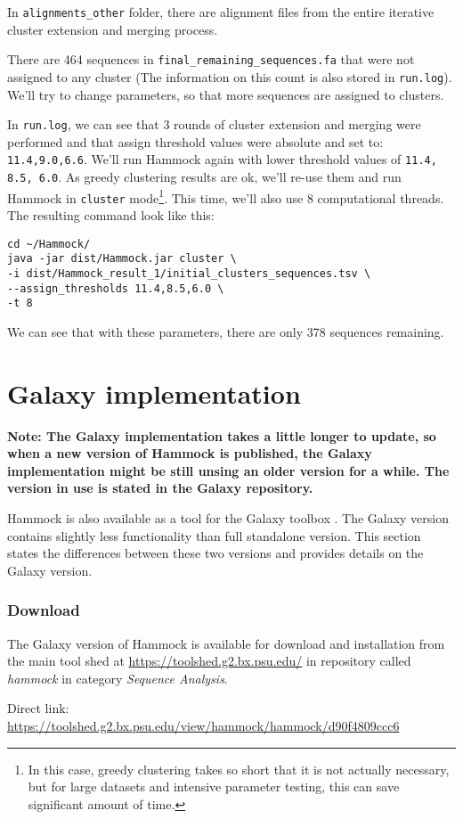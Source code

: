 \documentclass[11pt, a4paper, twoside, titlepage]{article}
\begin{document}
In \texttt{alignments\_other} folder, there are alignment files from the entire iterative cluster extension and merging process.

There are 464 sequences in \texttt{final\_remaining\_sequences.fa} that were not assigned to any cluster (The information on this count is also stored in \texttt{run.log}). We'll try to change parameters, so that more sequences are assigned to clusters.

In \texttt{run.log}, we can see that 3 rounds of cluster extension and merging were performed and that assign threshold values were absolute and set to: \texttt{11.4,9.0,6.6}. We'll run Hammock again with lower threshold values of \texttt{11.4, 8.5, 6.0}. As greedy clustering results are ok, we'll re-use them and run Hammock in \texttt{cluster} mode\footnote{In this case, greedy clustering takes so short that it is not actually necessary, but for large datasets and intensive parameter testing, this can save significant amount of time.}. This time, we'll also use 8 computational threads. The resulting command look like this: 

\begin{verbatim}
cd ~/Hammock/
java -jar dist/Hammock.jar cluster \ 
-i dist/Hammock_result_1/initial_clusters_sequences.tsv \ 
--assign_thresholds 11.4,8.5,6.0 \ 
-t 8
\end{verbatim}

We can see that with these parameters, there are only 378 sequences remaining.


\section{Galaxy implementation}

\large\textbf{Note: The Galaxy implementation takes a little longer to update, so when a new version of Hammock is published, the Galaxy implementation might be still unsing an older version for a while. The version in use is stated in the Galaxy repository.}
\newline
\newline

Hammock is also available as a tool for the Galaxy toolbox \cite{Giardine2005}. The Galaxy version contains slightly less functionality than full standalone version. This section states the differences between these two versions and provides details on the Galaxy version. 

\subsubsection{Download}
\begin{sloppypar}
The Galaxy version of Hammock is available for download and installation from the main tool shed at \mbox{\url{https://toolshed.g2.bx.psu.edu/}} in repository called \emph{hammock} in category \emph{Sequence Analysis}.

Direct link: \mbox{\url{https://toolshed.g2.bx.psu.edu/view/hammock/hammock/d90f4809ccc6}}

\end{sloppypar}
\end{document}
